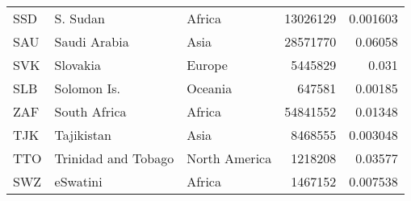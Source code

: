 \begin{table}[h!]
\begin{tabular}{lllrr}
        SSD     & S. Sudan            & Africa        & 13026129  & 0.001603      \\
        SAU     & Saudi Arabia        & Asia          & 28571770  & 0.06058       \\
        SVK     & Slovakia            & Europe        & 5445829   & 0.031         \\
        SLB     & Solomon Is.         & Oceania       & 647581    & 0.00185       \\
        ZAF     & South Africa        & Africa        & 54841552  & 0.01348       \\
        TJK     & Tajikistan          & Asia          & 8468555   & 0.003048      \\
        TTO     & Trinidad and Tobago & North America & 1218208   & 0.03577       \\
        SWZ     & eSwatini            & Africa        & 1467152   & 0.007538      \\
        \bottomrule
    \end{tabular}
\end{table}
